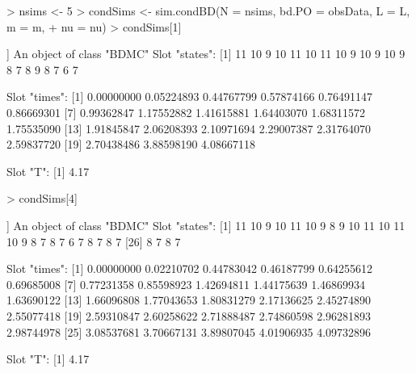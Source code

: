 \documentclass[12pt]{article}
\begin{document}
\begin{Schunk}
\begin{Sinput}
> nsims <- 5
> condSims <- sim.condBD(N = nsims, bd.PO = obsData, L = L, m = m, 
+    nu = nu)
> condSims[1]
\end{Sinput}
\begin{Soutput}
[[1]]
An object of class "BDMC"
Slot "states":
 [1] 11 10  9 10 11 10 11 10  9 10  9 10  9  8  7  8  9  8  7  6  7

Slot "times":
 [1] 0.00000000 0.05224893 0.44767799 0.57874166 0.76491147 0.86669301
 [7] 0.99362847 1.17552882 1.41615881 1.64403070 1.68311572 1.75535090
[13] 1.91845847 2.06208393 2.10971694 2.29007387 2.31764070 2.59837720
[19] 2.70438486 3.88598190 4.08667118

Slot "T":
[1] 4.17
\end{Soutput}
\begin{Sinput}
> condSims[4]
\end{Sinput}
\begin{Soutput}
[[1]]
An object of class "BDMC"
Slot "states":
 [1] 11 10  9 10 11 10  9  8  9 10 11 10 11 10  9  8  7  8  7  6  7  8  7  8  7
[26]  8  7  8  7

Slot "times":
 [1] 0.00000000 0.02210702 0.44783042 0.46187799 0.64255612 0.69685008
 [7] 0.77231358 0.85598923 1.42694811 1.44175639 1.46869934 1.63690122
[13] 1.66096808 1.77043653 1.80831279 2.17136625 2.45274890 2.55077418
[19] 2.59310847 2.60258622 2.71888487 2.74860598 2.96281893 2.98744978
[25] 3.08537681 3.70667131 3.89807045 4.01906935 4.09732896

Slot "T":
[1] 4.17
\end{Soutput}
\end{Schunk}


\end{document}
